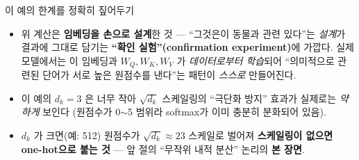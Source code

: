 \begin{frame}{이 예의 한계를 정확히 짚어두기}
  \begin{itemize}
    \item 위 계산은 \textbf{임베딩을 손으로 설계}한 것 —
      ``그것은이 동물과 관련 있다''는 \emph{설계}가 결과에 그대로
      담기는 \textbf{``확인 실험''(confirmation experiment)}에
      가깝다. 실제 모델에서는 이 임베딩과 $W_Q, W_K, W_V$ 가
      \emph{데이터로부터 학습}되어 ``의미적으로 관련된 단어가
      서로 높은 원점수를 낸다''는 패턴이 \emph{스스로}
      만들어진다.
    \item 이 예의 $d_k = 3$ 은 너무 작아 $\sqrt{d_k}$ 스케일링의
      ``극단화 방지'' 효과가 실제로는 \emph{약하게} 보인다
      (원점수가 0$\sim$5 범위라 softmax가 이미 충분히
      분화되어 있음).
    \item $d_k$ 가 크면(예: 512) 원점수가
      $\sqrt{d_k} \approx 23$ 스케일로 벌어져 \textbf{스케일링이
      없으면 one-hot으로 붙는 것} — 앞 절의 ``무작위 내적
      분산'' 논리의 \textbf{본 장면}.
  \end{itemize}
\end{frame}
